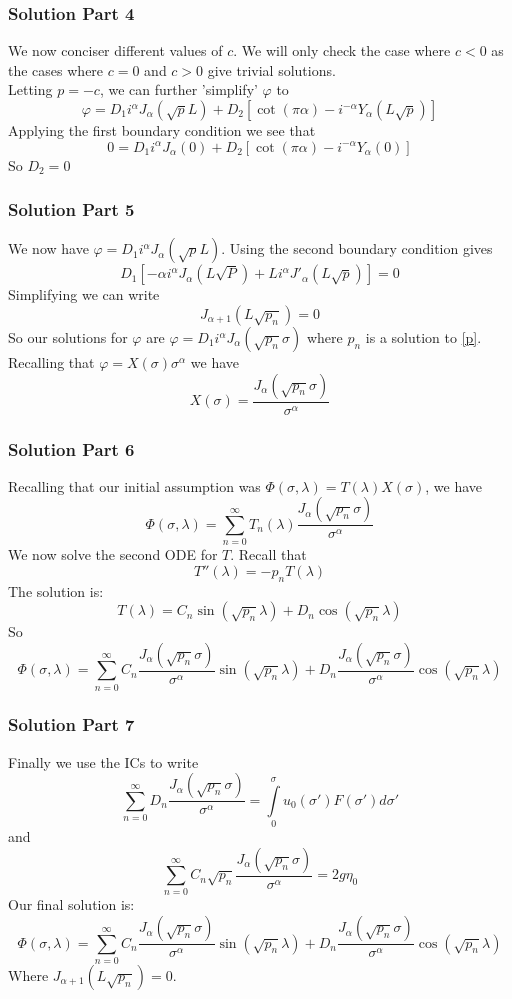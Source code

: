 	
	
	
	
	
	
	
	
	\begin{frame}
		\frametitle{Solution Part 4}
		 We now conciser different values of $c$. We will only check the case where $c<0$ as the cases where $c=0$ and $c>0$ give trivial solutions.\\
		Letting $p=-c$, we can further 'simplify' $\varphi$ to 
		\[\varphi=D_1 i^\alpha J_\alpha(\sqrt{p}L)+D_2\left[\cot(\pi \alpha)-i^{-\alpha}Y_\alpha(L\sqrt{p})\right]\]
		Applying the first boundary condition we see that 
		\[0=D_1 i^\alpha J_\alpha(0)+D_2\left[\cot(\pi \alpha)-i^{-\alpha}Y_\alpha(0)\right]\]
		So $D_2=0$
	\end{frame}
	
	
	
		\begin{frame}
		\frametitle{Solution Part 5}
		 We now have $\varphi=D_1 i^\alpha J_\alpha(\sqrt{p}L)$. Using the second boundary condition gives
		\[
		D_1\left[-\alpha i^\alpha J_\alpha(L\sqrt{P})+Li^\alpha J'_\alpha(L\sqrt{p})\right]=0
		\]
		Simplifying we can write
		\begin{equation}
		J_{\alpha+1}(L\sqrt{p_n})=0\label{p}
		\end{equation}
		So our solutions for $\varphi$ are $\varphi=D_1i^\alpha J_\alpha(\sqrt{p_n}\sigma)$ where $p_n$ is a solution to \eqref{p}. Recalling that $\varphi=X(\sigma)\sigma ^\alpha$ we have
		\[
		X(\sigma)=\frac{J_\alpha(\sqrt{p_n}\sigma)}{\sigma^\alpha}
		\]
	\end{frame}
	
	
	
	\begin{frame}
		\frametitle{Solution Part 6}
		Recalling that our initial assumption was $\Phi(\sigma,\lambda)=T(\lambda)X(\sigma)$, we have
		\[
		\Phi(\sigma,\lambda)=\sum_{n=0}^\infty T_n(\lambda)\frac{J_\alpha(\sqrt{p_n}\sigma)}{\sigma^\alpha}
		\]
		We now solve the second ODE for $T$. Recall that
		$$T''(\lambda)=-p_nT(\lambda)$$
		The solution is:
		\[T(\lambda)=C_n \sin(\sqrt{p_n}\lambda)+D_n\cos(\sqrt{p_n}\lambda)\]
		So
		\[
		\Phi(\sigma,\lambda)=\sum_{n=0}^\infty C_n\frac{J_\alpha(\sqrt{p_n}\sigma)}{\sigma^\alpha} \sin(\sqrt{p_n}\lambda)+D_n\frac{J_\alpha(\sqrt{p_n}\sigma)}{\sigma^\alpha}\cos(\sqrt{p_n}\lambda)
		\]
	\end{frame}
	
	
	
	
		\begin{frame}
		\frametitle{Solution Part 7}
		Finally we use the ICs to write
		\[
		\sum_{n=0}^\infty D_n\frac{J_\alpha(\sqrt{p_n}\sigma)}{\sigma^\alpha}=\int\limits_0^\sigma u_0(\sigma ')F(\sigma ')d \sigma'
		\] and
		\[
		\sum_{n=0}^\infty C_n\sqrt{p_n}\frac{J_\alpha(\sqrt{p_n}\sigma)}{\sigma^\alpha} =2g\eta_0
		\]
		 Our final solution is:
				\[
		\Phi(\sigma,\lambda)=\sum_{n=0}^\infty C_n\frac{J_\alpha(\sqrt{p_n}\sigma)}{\sigma^\alpha} \sin(\sqrt{p_n}\lambda)+D_n\frac{J_\alpha(\sqrt{p_n}\sigma)}{\sigma^\alpha}\cos(\sqrt{p_n}\lambda)
		\]
		Where $J_{\alpha+1}(L\sqrt{p_n})=0$.
	\end{frame}
	
